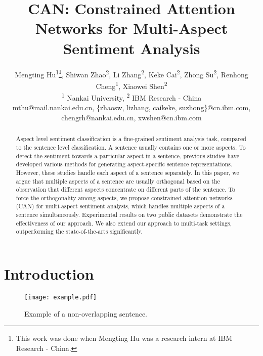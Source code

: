 \documentclass[11pt,a4paper]{article}
\title{CAN: Constrained Attention Networks for Multi-Aspect Sentiment Analysis}
\author{Mengting Hu\textsuperscript{1}\thanks{\quad This work was done when Mengting Hu was a research intern at IBM Research - China.}, Shiwan Zhao\textsuperscript{2}, Li Zhang\textsuperscript{2}, Keke Cai\textsuperscript{2},
Zhong Su\textsuperscript{2}, Renhong Cheng\textsuperscript{1}, Xiaowei Shen\textsuperscript{2} \\
\textsuperscript{1} Nankai University, \textsuperscript{2} IBM Research - China \\
mthu@mail.nankai.edu.cn, \{zhaosw, lizhang, caikeke, suzhong\}@cn.ibm.com, \\ chengrh@nankai.edu.cn, xwshen@cn.ibm.com
}
\begin{document}
\maketitle
\begin{abstract}
Aspect level sentiment classification is a fine-grained sentiment analysis task, compared to the sentence level classification. A sentence usually contains one or more aspects. To detect the sentiment towards a particular aspect in a sentence, previous studies have developed various methods for generating aspect-specific sentence representations. However, these studies handle each aspect of a sentence separately. In this paper, we argue that multiple aspects of a sentence are usually orthogonal based on the observation that different aspects concentrate on different parts of the sentence. To force the orthogonality among aspects, we propose constrained attention networks (CAN) for multi-aspect sentiment analysis, which handles multiple aspects of a sentence simultaneously. Experimental results on two public datasets demonstrate the effectiveness of our approach. We also extend our approach to multi-task settings, outperforming the state-of-the-arts significantly.
\end{abstract}

\section{Introduction}

\begin{figure}
\setlength{\abovecaptionskip}{0.2cm}    %
\setlength{\belowcaptionskip}{-0.2cm}   %
\centering
\texttt{[image: example.pdf]}
\caption{Example of a non-overlapping sentence.} 
  \label{sentence} 
\end{figure}
\end{document}
